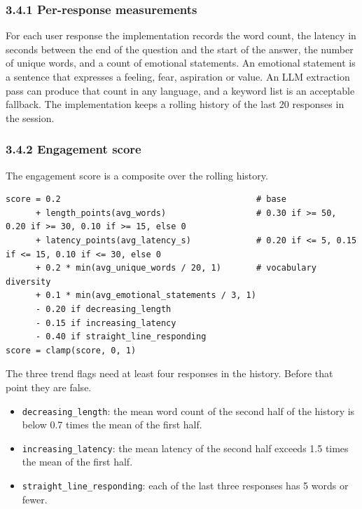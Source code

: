 \documentclass[11pt]{article}
\providecommand{\tightlist}{\setlength{\itemsep}{0pt}\setlength{\parskip}{0pt}}
\begin{document}
\subsubsection{3.4.1 Per-response measurements}

For each user response the implementation records the word count, the
latency in seconds between the end of the question and the start of the
answer, the number of unique words, and a count of emotional statements.
An emotional statement is a sentence that expresses a feeling, fear,
aspiration or value. An LLM extraction pass can produce that count in
any language, and a keyword list is an acceptable fallback. The
implementation keeps a rolling history of the last 20 responses in the
session.

\subsubsection{3.4.2 Engagement score}

The engagement score is a composite over the rolling history.

\begin{verbatim}
score = 0.2                                       # base
      + length_points(avg_words)                  # 0.30 if >= 50, 0.20 if >= 30, 0.10 if >= 15, else 0
      + latency_points(avg_latency_s)             # 0.20 if <= 5, 0.15 if <= 15, 0.10 if <= 30, else 0
      + 0.2 * min(avg_unique_words / 20, 1)       # vocabulary diversity
      + 0.1 * min(avg_emotional_statements / 3, 1)
      - 0.20 if decreasing_length
      - 0.15 if increasing_latency
      - 0.40 if straight_line_responding
score = clamp(score, 0, 1)
\end{verbatim}

The three trend flags need at least four responses in the history.
Before that point they are false.

\begin{itemize}
\tightlist
\item
  \texttt{decreasing\_\allowbreak{}length}: the mean word count of the second half of
  the history is below 0.7 times the mean of the first half.
\item
  \texttt{increasing\_\allowbreak{}latency}: the mean latency of the second half
  exceeds 1.5 times the mean of the first half.
\item
  \texttt{straight\_\allowbreak{}line\_\allowbreak{}responding}: each of the last three responses
  has 5 words or fewer.
\end{itemize}
\end{document}
